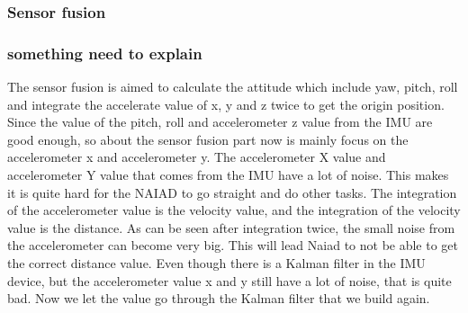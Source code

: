 		\subsubsection{Sensor fusion} %
		\noindent
		\subsubsection*{something need to explain}
		\noindent
		The sensor fusion is aimed to calculate the attitude which include yaw, pitch, roll and integrate the accelerate value of x, y and z twice to get the origin position. Since the value of the pitch, roll and accelerometer z value from the IMU are good enough, so about the sensor fusion part now is mainly focus on the accelerometer x and accelerometer y.
	The accelerometer X value and accelerometer Y value that comes from the IMU have a lot of noise. This makes it is quite hard for the NAIAD to go straight and do other tasks. The integration of the accelerometer value is the velocity value, and the integration of the velocity value is the distance. As can be seen after integration twice, the small noise from the accelerometer can become very big. This will lead Naiad to not be able to get the correct distance value. Even though there is a Kalman filter in the IMU device, but the accelerometer value x and y still have a lot of noise, that is quite bad. Now we let the value go through the Kalman filter that we build again.
